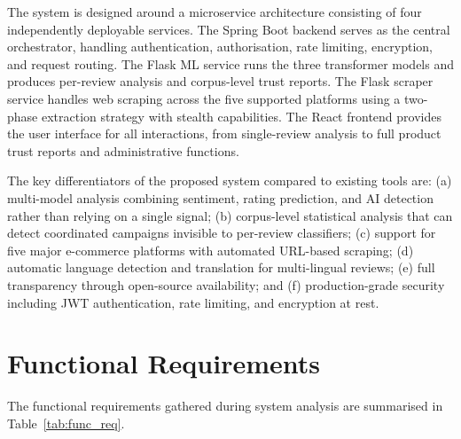 \documentclass[12pt,a4paper,oneside]{report}
\begin{document}
The system is designed around a microservice architecture consisting of
four independently deployable services. The Spring Boot backend serves as
the central orchestrator, handling authentication, authorisation, rate
limiting, encryption, and request routing. The Flask ML service runs the
three transformer models and produces per-review analysis and corpus-level
trust reports. The Flask scraper service handles web scraping across the
five supported platforms using a two-phase extraction strategy with
stealth capabilities. The React frontend provides the user interface for
all interactions, from single-review analysis to full product trust reports
and administrative functions.

The key differentiators of the proposed system compared to existing tools
are: (a) multi-model analysis combining sentiment, rating prediction, and
AI detection rather than relying on a single signal; (b) corpus-level
statistical analysis that can detect coordinated campaigns invisible to
per-review classifiers; (c) support for five major e-commerce platforms
with automated URL-based scraping; (d) automatic language detection and
translation for multi-lingual reviews; (e) full transparency through
open-source availability; and (f) production-grade security including
JWT authentication, rate limiting, and encryption at rest.

\section{Functional Requirements}
The functional requirements gathered during system analysis are
summarised in Table~\ref{tab:func_req}.
\end{document}
